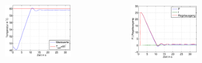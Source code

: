 \begin{frame}
\begin{columns}[c]
\begin{figure}[H]
\begin{center}
            \end{center}
            \end{figure}
            \begin{figure}[H]
            \begin{center}
                    \includegraphics[scale=0.3]{./img/plots/2d_kb_1_5_t_200.eps}
            \end{center}
            \end{figure}
            \begin{figure}[H]
            \begin{center}
                    \includegraphics[scale=0.3]{./img/plots/2d_kb_2_t_200_aus.eps}
            \end{center}
            \end{figure}
    \end{columns}
\end{frame}


